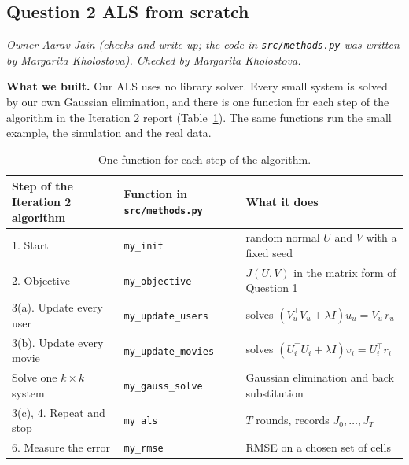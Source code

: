 
\subsection*{Question 2 ALS from scratch}
\textit{Owner Aarav Jain (checks and write-up; the code in \texttt{src/methods.py} was written by Margarita Kholostova). Checked by Margarita Kholostova.}

\textbf{What we built.} Our ALS uses no library solver. Every small system is solved by our own Gaussian elimination, and there is one function for each step of the algorithm in the Iteration 2 report (Table~\ref{tab:functions}). The same functions run the small example, the simulation and the real data.

\begin{table}[h]
\centering
\small
\begin{tabular}{p{3.9cm}lp{6.2cm}}
\hline
Step of the Iteration 2 algorithm & Function in \texttt{src/methods.py} & What it does \\
\hline
1. Start & \texttt{my\_init} & random normal $U$ and $V$ with a fixed seed \\
2. Objective & \texttt{my\_objective} & $J(U,V)$ in the matrix form of Question 1 \\
3(a). Update every user & \texttt{my\_update\_users} & solves $(V_u^\top V_u + \lambda I)u_u = V_u^\top r_u$ \\
3(b). Update every movie & \texttt{my\_update\_movies} & solves $(U_i^\top U_i + \lambda I)v_i = U_i^\top r_i$ \\
Solve one $k \times k$ system & \texttt{my\_gauss\_solve} & Gaussian elimination and back substitution \\
3(c), 4. Repeat and stop & \texttt{my\_als} & $T$ rounds, records $J_0, \dots, J_T$ \\
6. Measure the error & \texttt{my\_rmse} & RMSE on a chosen set of cells \\
\hline
\end{tabular}
\caption{One function for each step of the algorithm.}
\label{tab:functions}
\end{table}

